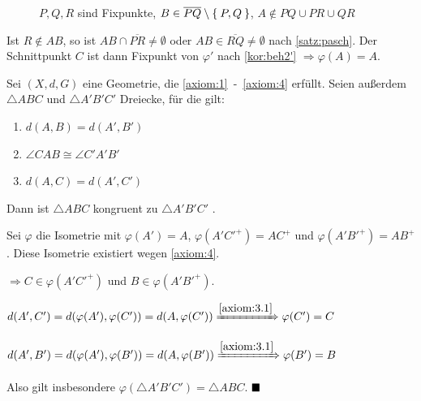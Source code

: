 \begin{beweis}
\begin{enumerate}[label=(Teil \roman*),ref=(Teil \roman*)]
        \begin{figure}[htp]
            \centering
            
            \caption{$P, Q, R$ sind Fixpunkte, $B \in \overline{PQ} \setminus \Set{P,Q}$, $A \notin PQ \cup PR \cup QR$}
            \label{fig:geometry-1}
        \end{figure}

        Ist $R \notin AB$, so ist $AB \cap \overline{PR} \neq \emptyset$
        oder $AB \in \overline{RQ} \neq \emptyset$ nach \cref{satz:pasch}.
        Der Schnittpunkt $C$ ist dann Fixpunkt von $\varphi'$
        nach \cref{kor:beh2'} $\Rightarrow \varphi(A) = A$.
    \end{enumerate}
\end{beweis}

\begin{bemerkung}%
    Sei $(X, d, G)$ eine Geometrie, die \ref{axiom:1}~-~\ref{axiom:4} erfüllt.
    Seien außerdem $\triangle ABC$ und $\triangle A'B'C'$ Dreiecke, für die gilt:
    \begin{enumerate}[label=(\roman*)]
        \item \label{bem:sws.i} $d(A, B) = d(A', B')$
        \item \label{bem:sws.ii} $\angle CAB \cong \angle C'A'B'$
        \item \label{bem:sws.iii} $d(A, C) = d(A', C')$
    \end{enumerate}

    Dann ist $\triangle ABC$ kongruent zu $\triangle A'B'C'$ .
\end{bemerkung}

\begin{beweis}
    Sei $\varphi$ die Isometrie mit $\varphi(A') = A$, $\varphi(A'C'^+) = AC^+$
    und $\varphi(A'B'^+) = AB^+$. Diese Isometrie existiert wegen \cref{axiom:4}.

    $\Rightarrow C \in \varphi(A'C'^+)$ und $B \in \varphi(A'B'^+)$.

    $d(A',C')= d(\varphi(A'), \varphi(C')) = d(A, \varphi(C')) \xRightarrow{\ref{axiom:3.1}} \varphi(C') = C$

    $d(A',B')= d(\varphi(A'), \varphi(B')) = d(A, \varphi(B')) \xRightarrow{\ref{axiom:3.1}} \varphi(B') = B$

    Also gilt insbesondere $\varphi(\triangle A'B'C') = \triangle ABC$. $\qed$
\end{beweis}

